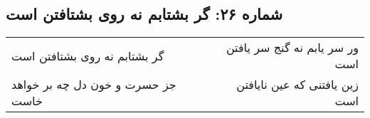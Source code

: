 \begin{center}
\section*{شماره ۲۶: گر بشتابم نه روی بشتافتن است}
\label{sec:026}
\begin{longtable}{l p{0.5cm} r}
گر بشتابم نه روی بشتافتن است
&&
ور سر یابم نه گنج سر یافتن است
\\
جز حسرت و خون دل چه بر خواهد خاست
&&
زین یافتنی که عین نایافتن است
\\
\end{longtable}
\end{center}
